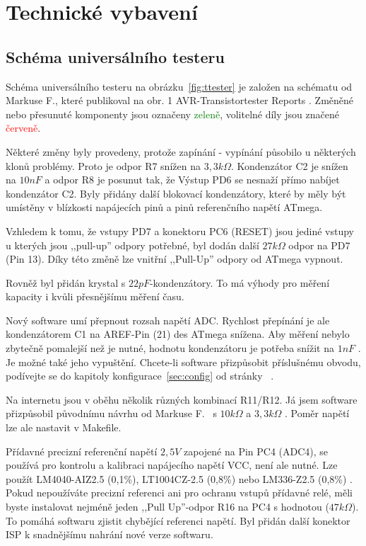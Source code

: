 \chapter{Technické vybavení}

\section{Schéma universálního testeru}
\label{sec:hardware}
Schéma universálního testeru na obrázku~\ref{fig:ttester} je založen na schématu od
Markuse F., které publikoval na obr. 1 AVR-Transistortester Reports \cite{Frejek}.
Změněné nebo přesunuté komponenty jsou označeny \textcolor{green}{zeleně}, volitelné díly jsou
značené \textcolor{red}{červeně}.

Některé změny byly provedeny, protože zapínání - vypínání působilo u některých klonů problémy.
Proto je odpor R7 snížen na \(3,3k\Omega\). 
Kondenzátor C2 je snížen na \(10nF\) a odpor R8 je posunut tak, že
Výstup PD6 se nesnaží přímo nabíjet kondenzátor C2.
Byly přidány další blokovací kondenzátory, které by měly být umístěny v blízkosti napájecích pinů
a pinů referenčního napětí ATmega.

Vzhledem k tomu, že vstupy PD7 a konektoru PC6 (RESET) jsou jediné vstupy u kterých
jsou  ,,pull-up'' odpory potřebné, byl dodán další \(27k\Omega\)  odpor na PD7 (Pin 13).
Díky této změně lze vnitřní  ,,Pull-Up'' odpory od ATmega vypnout.

Rovněž byl přidán krystal s \(22pF\)-kondenzátory.
To má výhody pro měření kapacity i kvůli přesnějšímu měření času.

Nový software umí přepnout rozsah napětí ADC. Rychlost přepínání je ale kondenzátorem C1
na AREF-Pin (21) des ATmega snížena.
Aby měření nebylo zbytečně pomalejší než je nutné, hodnotu kondenzátoru je potřeba snížit na \(1nF\) . 
Je možné také jeho vypuštění.
Chcete-li software přizpůsobit příslušnému obvodu, podívejte se do kapitoly
konfigurace~\ref{sec:config} od stránky~\pageref{sec:config} . 

Na internetu jsou v oběhu několik různých kombinací R11/R12.
Já jsem software přizpůsobil původnímu návrhu od Markuse F.~\cite{Frejek} s \(10k\Omega\) a \(3,3k\Omega\) .
Poměr napětí lze ale nastavit v Makefile.

Přídavné precizní referenční napětí \(2,5V\) zapojené na Pin PC4 (ADC4),
se používá pro kontrolu a kalibraci napájecího napětí VCC, není ale nutné.
Lze použít LM4040-AIZ2.5 (0,1\%), LT1004CZ-2.5 (0,8\%) nebo LM336-Z2.5 (0,8\%) .
Pokud nepoužíváte precizní referenci ani pro ochranu vstupů přídavné relé,
měli byste instalovat nejméně jeden  ,,Pull Up''-odpor R16 na PC4 s hodnotou (\(47k\Omega\)).
To pomáhá softwaru zjistit chybějící referenci napětí.
Byl přidán další konektor ISP k snadnějšímu nahrání nové verze softwaru.

